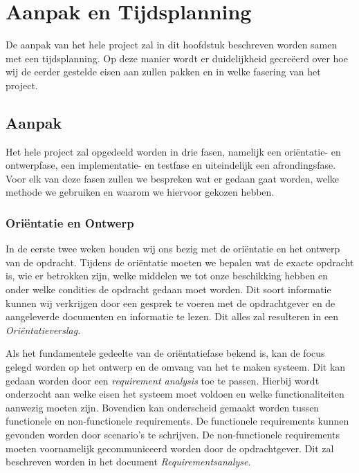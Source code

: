 \section{Aanpak en Tijdsplanning}
De aanpak van het hele project zal in dit hoofdstuk beschreven worden samen met een tijdsplanning. Op deze manier wordt er duidelijkheid gecre\"eerd over hoe wij de eerder gestelde eisen aan zullen pakken en in welke fasering van het project.

\subsection{Aanpak}
Het hele project zal opgedeeld worden in drie fasen, namelijk een ori\"entatie- en ontwerpfase, een implementatie- en testfase en uiteindelijk een afrondingsfase. Voor elk van deze fasen zullen we bespreken wat er gedaan gaat worden, welke methode we gebruiken en waarom we hiervoor gekozen hebben. 

\subsubsection{Ori\"entatie en Ontwerp}
In de eerste twee weken houden wij ons bezig met de ori\"entatie en het ontwerp van de opdracht. Tijdens de ori\"entatie moeten we bepalen wat de exacte opdracht is, wie er betrokken zijn, welke middelen we tot onze beschikking hebben en onder welke condities de opdracht gedaan moet worden. Dit soort informatie kunnen wij verkrijgen door een gesprek te voeren met de opdrachtgever en de aangeleverde documenten en informatie te lezen. Dit alles zal resulteren in een \emph{Ori\"entatieverslag}.

Als het fundamentele gedeelte van de ori\"entatiefase bekend is, kan de focus gelegd worden op het ontwerp en de omvang van het te maken systeem. Dit kan gedaan worden door een \emph{requirement analysis} toe te passen. Hierbij wordt onderzocht aan welke eisen het systeem moet voldoen en welke functionaliteiten aanwezig moeten zijn. Bovendien kan onderscheid gemaakt worden tussen functionele en non-functionele requirements. De functionele requirements kunnen gevonden worden door scenario's te schrijven. De non-functionele requirements moeten voornamelijk gecommuniceerd worden door de opdrachtgever. Dit zal beschreven worden in het document \emph{Requirementsanalyse}.

